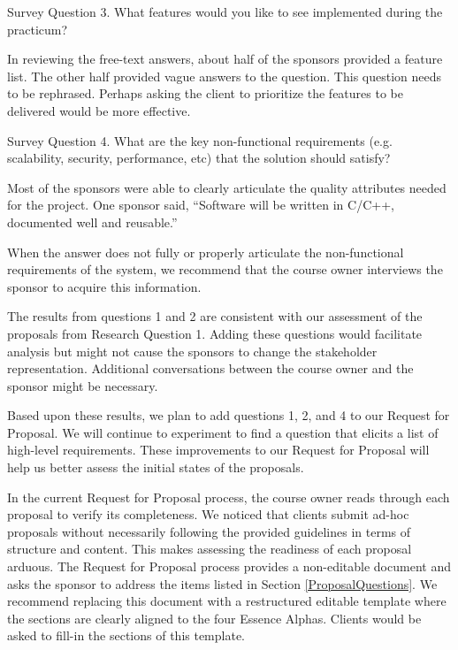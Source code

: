 \documentclass[conference]{IEEEtran}
\begin{document}
{Survey Question 3. What features would you like to see implemented during the
practicum? }

In reviewing the free-text answers, about half of the sponsors provided
a feature list. The other half provided vague answers to the question.
This question needs to be rephrased. Perhaps asking the client to
prioritize the features to be delivered would be more effective.

{Survey Question 4. What are the key non-functional requirements (e.g.
scalability, security, performance, etc) that the solution should
satisfy?}

Most of the sponsors were able to clearly articulate the quality
attributes needed for the project. One sponsor said, ``Software will be
written in C/C++, documented well and reusable.'' 

When the answer does not fully or properly articulate the
non-functional requirements of the system, we recommend that the course
owner interviews the sponsor to acquire this information. 

The results from questions 1 and 2 are consistent with our assessment
of the proposals from Research Question 1. Adding these questions would
facilitate analysis but might not cause the sponsors to change the
stakeholder representation. Additional conversations between the course owner and the sponsor might be necessary.

Based upon these results, we plan to add questions 1, 2, and 4 to our
Request for Proposal. We will continue to experiment to find a question
that elicits a list of high-level requirements. These improvements to
our Request for Proposal will help us better assess the initial states
of the proposals.



In the current Request for Proposal process, the course owner reads
through each proposal to verify its completeness. We noticed that
clients submit ad-hoc proposals without necessarily following the
provided guidelines in terms of structure and content. This makes
assessing the readiness of each proposal arduous. The Request for
Proposal process provides a non-editable document and asks the sponsor
to address the items listed in Section
\ref{ProposalQuestions}. We recommend replacing this
document with a restructured editable template where the sections are
clearly aligned to the four Essence Alphas. Clients would be asked to
fill-in the sections of this template. 
\end{document}
